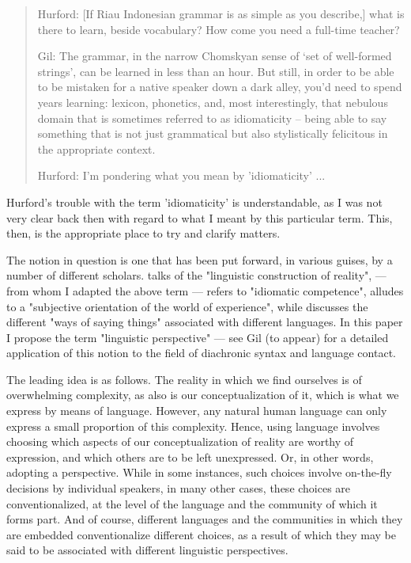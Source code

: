 \documentclass[output=paper,colorlinks,citecolor=brown
]{langscibook}
\begin{document}
\begin{quote}
    Hurford:	[If Riau Indonesian grammar is as simple as you describe,] what is there to learn, beside vocabulary? How come you need a full-time teacher?

    Gil: The grammar, in the narrow Chomskyan sense of ‘set of well-formed strings’, can be learned in less than an hour. But still, in order to be able to be mistaken for a native speaker down a dark alley, you’d need to spend years learning: lexicon, phonetics, and, most interestingly, that nebulous domain that is sometimes referred to as idiomaticity – being able to say something that is not just grammatical but also stylistically felicitous in the appropriate context.

    Hurford:	I'm pondering what you mean by 'idiomaticity' ...
\end{quote}

Hurford's trouble with the term 'idiomaticity' is understandable, as I was not very clear back then with regard to what I meant by this particular term.  This, then, is the appropriate place to try and clarify matters.

The notion in question is one that has been put forward, in various guises, by a number of different scholars. \citet{grace1987linguistic} talks of the "linguistic construction of reality", \citet{pawlk
} — from whom I adapted the above term — refers to "idiomatic competence", \citet[91]{slobin1996thought} alludes to a "subjective orientation of the world of experience",  while \citet{ross2001contact} discusses the different "ways of saying things" associated with different languages.  In this paper I propose the term "linguistic perspective" — see Gil (to appear) for a detailed application of this notion to the field of diachronic syntax and language contact.

The leading idea is as follows.  The reality in which we find ourselves is of overwhelming complexity, as also is our conceptualization of it, which is what we express by means of language.  However, any natural human language can only express a small proportion of this complexity.  Hence, using language involves choosing which aspects of our conceptualization of reality are worthy of expression, and which others are to be left unexpressed.  Or, in other words, adopting a perspective.  While in some instances, such choices involve on-the-fly decisions by individual speakers, in many other cases, these choices are conventionalized, at the level of the language and the community of which it forms part.  And of course, different languages and the communities in which they are embedded conventionalize different choices, as a result of which they may be said to be associated with different linguistic perspectives.
\end{document}
